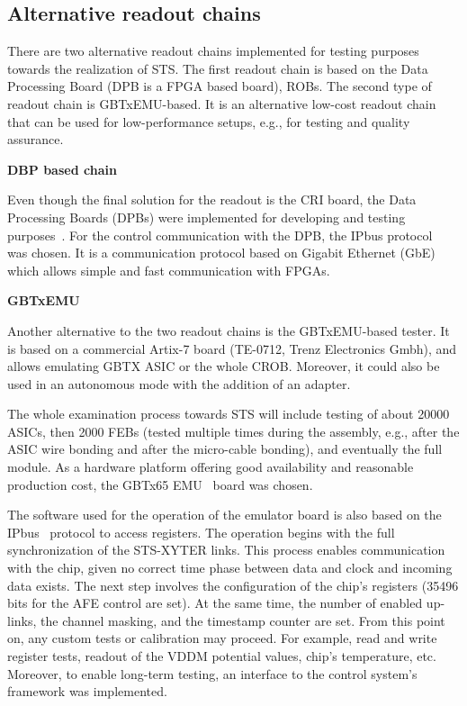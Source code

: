 \subsection{Alternative readout chains}
\label{tester}
There are two alternative readout chains implemented for testing purposes towards the realization of \gls{STS}. The first readout chain is based on the Data Processing Board (\gls{DPB} is a \gls{FPGA} based board), \glspl{ROB}. The second type of readout chain is GBTxEMU-based. It is an alternative low-cost readout chain that can be used for
low-performance setups, e.g., for testing and quality assurance. \bigbreak


\textbf{DBP based chain}\bigbreak


Even though the final solution for the readout is the \gls{CRI} board, the Data Processing Boards (\glspl{DPB}) were implemented for developing and testing purposes~\cite{Loizeau}. For the control communication with the \gls{DPB}, the IPbus protocol~\cite{ipbus} was chosen. It is a communication protocol based on Gigabit Ethernet (GbE) which allows simple and fast communication with \glspl{FPGA}. \bigbreak

\textbf{GBTxEMU} \bigbreak


Another alternative to the two readout chains is the GBTxEMU-based tester. It is based on a commercial Artix-7 board (TE-0712, Trenz Electronics Gmbh), and allows emulating GBTX ASIC or the whole \gls{CROB}. Moreover, it could also be used in an autonomous mode with the addition of an adapter.


The whole examination process towards \gls{STS} will include testing of about 20000 ASICs, then 2000 FEBs (tested  multiple times during the assembly, e.g., after the ASIC wire bonding and after the micro-cable bonding), and eventually the full module. As a hardware platform offering good availability and reasonable production cost, the GBTx65 EMU~\cite{zabolotny1} board was chosen.

The software used for the operation of the emulator board is also based on the IPbus~\cite{ipbus} protocol to access registers.
The operation begins with the full synchronization of the STS-XYTER links. This process enables communication with the chip, given no correct time phase between data and clock and incoming data exists. The next step involves the configuration of the chip's registers (35496 bits for the AFE control are set). At the same time, the number of enabled up-links, the channel masking, and the timestamp counter are set.  From this point on, any custom tests or calibration may proceed. For example, read and write register tests, readout of the VDDM potential values, chip's temperature, etc. Moreover, to enable long-term testing, an interface to the control system's framework was implemented.

